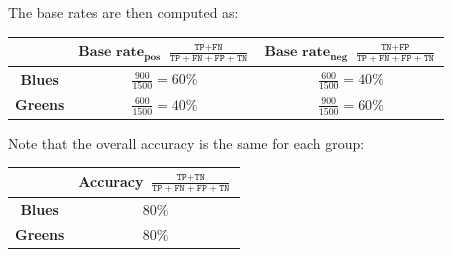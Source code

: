 \begin{example}
\begin{description}
            The base rates are then computed as:
            \begin{center}
                \footnotesize
                \begin{tabular}{c|cc}
                    \toprule
                        & $\textbf{Base rate}_\textbf{pos}$ $\frac{\texttt{TP}+\texttt{FN}}{\texttt{TP}+\texttt{FN}+\texttt{FP}+\texttt{TN}}$ 
                        & $\textbf{Base rate}_\textbf{neg}$ $\frac{\texttt{TN}+\texttt{FP}}{\texttt{TP}+\texttt{FN}+\texttt{FP}+\texttt{TN}}$ \\
                    \midrule
                        \textbf{Blues} & $\frac{900}{1500} = 60\%$ & $\frac{600}{1500} = 40\%$ \\
                        \textbf{Greens} & $\frac{600}{1500} = 40\%$ & $\frac{900}{1500} = 60\%$ \\
                    \bottomrule
                \end{tabular}
            \end{center}

            Note that the overall accuracy is the same for each group:
            \begin{center}
                \footnotesize
                \begin{tabular}{c|c}
                    \toprule
                        & \textbf{Accuracy} $\frac{\texttt{TP}+\texttt{TN}}{\texttt{TP}+\texttt{FN}+\texttt{FP}+\texttt{TN}}$ \\
                    \midrule
                        \textbf{Blues} & $80\%$ \\
                        \textbf{Greens} & $80\%$ \\
                    \bottomrule
                \end{tabular}
            \end{center}
    \end{description}
\end{example}

